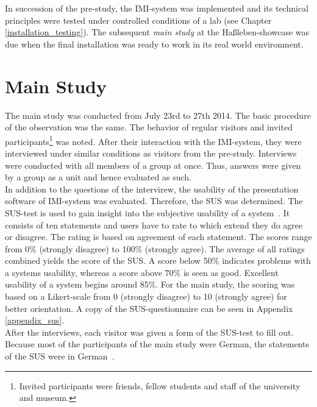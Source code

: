 In succession of the pre-study, the \ac{IMI}-system was implemented and its technical principles were tested under controlled conditions of a lab (see Chapter \ref{installation_testing}). The subsequent \textit{main study} at the Haßleben-showcase was due when the final installation was ready to work in its real world environment.


\section{Main Study}
\label{evaluation_study}

The main study was conducted from July 23rd to 27th 2014. The basic procedure of the observation was the same. The behavior of regular visitors and invited participants\footnote{Invited participants were friends, fellow students and staff of the university and museum.} was noted. After their interaction with the \ac{IMI}-system, they were interviewed under similar conditions as visitors from the pre-study. Interviews were conducted with all members of a group at once. Thus, answers were given by a group as a unit and hence evaluated as such. 
\\
In addition to the questions of the intervirew, the usability of the presentation software of \ac{IMI}-system was evaluated. Therefore, the \ac{SUS} was determined. The \ac{SUS}-test is used to gain insight into the subjective usability of a system~\cite{SUStest}. It consists of ten statements and users have to rate to which extend they do agree or disagree. The rating is based on agreement of each statement. The scores range from 0$\%$ (strongly disagree) to 100$\%$ (strongly agree). The average of all ratings combined yields the score of the \ac{SUS}. A score below 50$\%$ indicates problems with a systems usability, whereas a score above 70$\%$ is seen as good. Excellent usability of a system begins around 85$\%$. For the main study, the scoring was based on a Likert-scale from 0 (strongly disagree) to 10 (strongly agree) for better orientation. A copy of the \ac{SUS}-questionnaire can be seen in Appendix \ref{appendix_sus}.
\\
After the interviews, each visitor was given a form of the \ac{SUS}-test to fill out. Because most of the participants of the main study were German, the statements of the \ac{SUS} were in German~\cite{SUSdeu}.
 
